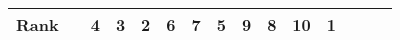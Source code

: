 \begin{tabular}{ll|rrrrrrrrr|rrrr}


  


  
  Rank & &
  4 & 3 & 2 & 6 & 7 & 5 & 9 & 8 & 10 & 1 &  &  &  \\\hline\hline
\end{tabular}


